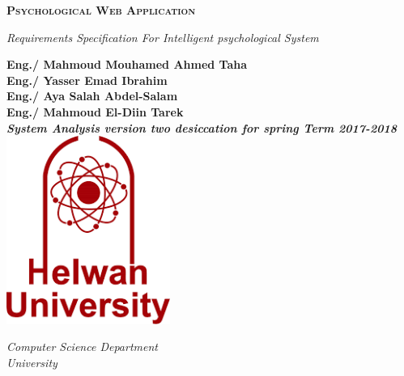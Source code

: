\documentclass[../Psychological_system_web_application.tex]{subfiles}
\begin{document}
	\begin{titlepage}
	\begin{center}
			\vspace*{1cm}
			\Huge
			\textsc{\textbf{\color{red} Psychological Web Application}}
			\vspace*{0.5cm}
			
			\LARGE
			 \textit{Requirements Specification For Intelligent psychological System}
			

			\vspace*{1.5cm}
			
			\textsf{\textbf{Eng./ Mahmoud Mouhamed Ahmed Taha}}\\
			\textsf{\textbf{Eng./ Yasser Emad Ibrahim }}\\
			\textsf{\textbf{Eng./ Aya Salah Abdel-Salam}}\\
			\textsf{\textbf{Eng./ Mahmoud El-Diin Tarek}}\\
			\vfill
			\textsl{\textbf{System Analysis version two desiccation for spring Term 2017-2018}}\\
			\vspace*{0.8cm}
			\includegraphics[width=0.4\textwidth]{Logo}
			\Large
			 
			\textsl{Computer Science Department}\\
			\textsl{University}\\
		\end{center}
	\end{titlepage}
\end{document}
